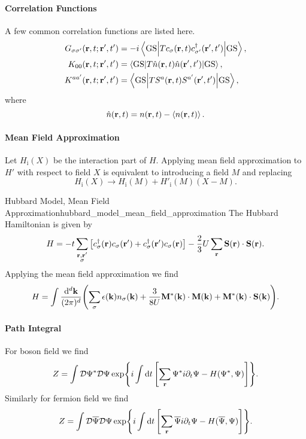 \documentclass{article}
\begin{document}
\paragraph*{Correlation Functions}
A few common correlation functions are listed here.
\begin{align*}
    G_{\sigma\sigma'}(\vb{r},t;\vb{r}',t') &= -i \ev**{T c_\sigma(\vb{r},t) c^\dagger_{\sigma'}(\vb{r}',t')}{\mathrm{GS}}, \\
    K_{00}(\vb{r},t;\vb{r}',t') &= \ev**{T \hat{n}(\vb{r},t) \hat{n}(\vb{r}',t')}{\mathrm{GS}}, \\
    K^{aa'}(\vb{r},t;\vb{r}',t') &= \ev**{T S^a(\vb{r},t) S^{a'}(\vb{r}',t')}{\mathrm{GS}},
\end{align*}
where
\[ \hat{n}(\vb{r},t) = n(\vb{r},t) - \ev{n(\vb{r},t)}. \]

\paragraph*{Mean Field Approximation}
Let $H_{\mathrm{i}}(X)$ be the interaction part of $H$.
Applying mean field approximation to $H'$ with respect to field $X$ is equivalent to introducing a field $M$ and replacing
\[ H_{\mathrm{i}}(X) \rightarrow H_{\mathrm{i}}(M) + H'_{\mathrm{i}}(M)(X - M).  \]

\begin{example}{Hubbard Model, Mean Field Approximation}{hubbard_model_mean_field_approximation}
    The Hubbard Hamiltonian is given by
    \[ H = -t\sum_{\substack{\vb{r},\vb{r}'\\ \sigma}} \qty[c^\dagger_\sigma(\vb{r}) c_{\sigma}(\vb{r}') + c^\dagger_\sigma(\vb{r}')c_\sigma(\vb{r})] - \frac{2}{3} U \sum_{\vb{r}} \vb{S}(\vb{r}) \cdot \vb{S}(\vb{r}). \]
    Applying the mean field approximation we find
    \[ H = \int \frac{\dd[d]{\vb{k}}}{(2\pi)^d} \qty(\sum_\sigma \epsilon(\vb{k}) n_\sigma(\vb{k}) + \frac{3}{8U}\vb{M}^*(\vb{k})\cdot \vb{M}(\vb{k}) + \vb{M}^*(\vb{k})\cdot \vb{S}(\vb{k})). \]
\end{example}

\paragraph*{Path Integral}
For boson field we find
\[ Z = \int \mathcal{D}\Psi^* \mathcal{D}\Psi \exp{i\int \dd{t} \qty[\sum_{\vb{r}} \Psi^* i\partial_t \Psi - H(\Psi^*,\Psi)]}. \]
Similarly for fermion field we find
\[ Z = \int \mathcal{D}\overline{\Psi} \mathcal{D}\Psi \exp{i\int \dd{t} \qty[\sum_{\vb{r}} \overline{\Psi} i\partial_t \Psi - H(\overline{\Psi},\Psi)]}. \]
\end{document}
